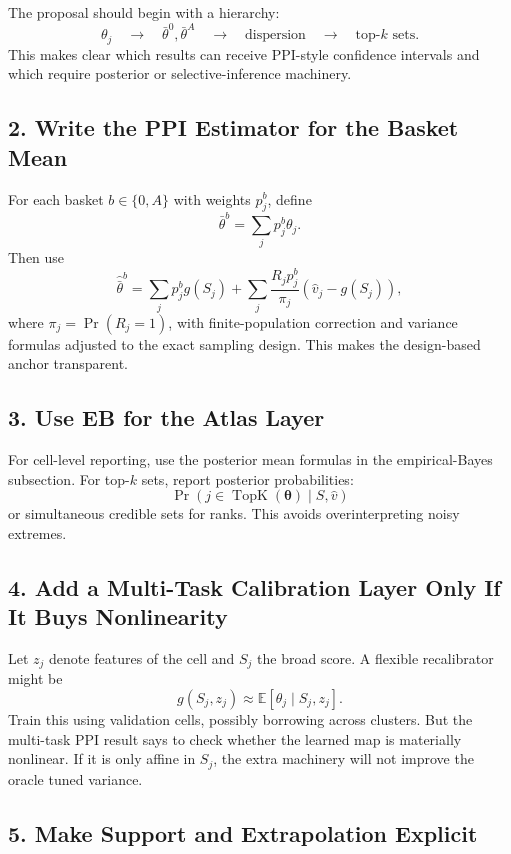 \documentclass[11pt]{article}
\newcommand{\E}{\mathbb{E}}
\newcommand{\thetav}{\boldsymbol{\theta}}
\begin{document}
The proposal should begin with a hierarchy:
\[
  \theta_j
  \quad\rightarrow\quad
  \bar\theta^0,\bar\theta^A
  \quad\rightarrow\quad
  \text{dispersion}
  \quad\rightarrow\quad
  \text{top-}k\text{ sets}.
\]
This makes clear which results can receive PPI-style confidence intervals and which require posterior or selective-inference machinery.

\subsection{2. Write the PPI Estimator for the Basket Mean}

For each basket $b\in\{0,A\}$ with weights $p_j^b$, define
\[
  \bar\theta^b=\sum_j p_j^b\theta_j.
\]
Then use
\[
  \widehat{\bar\theta}^{b}
  =
  \sum_j p_j^b g(S_j)
  +
  \sum_j
  \frac{R_j p_j^b}{\pi_j}
  \left(\widehat v_j-g(S_j)\right),
\]
where $\pi_j=\Pr(R_j=1)$, with finite-population correction and variance formulas adjusted to the exact sampling design. This makes the design-based anchor transparent.

\subsection{3. Use EB for the Atlas Layer}

For cell-level reporting, use the posterior mean formulas in the empirical-Bayes subsection. For top-$k$ sets, report posterior probabilities:
\[
  \Pr(j\in \operatorname{TopK}(\thetav)\mid S,\widehat v)
\]
or simultaneous credible sets for ranks. This avoids overinterpreting noisy extremes.

\subsection{4. Add a Multi-Task Calibration Layer Only If It Buys Nonlinearity}

Let $z_j$ denote features of the cell and $S_j$ the broad score. A flexible recalibrator might be
\[
  g(S_j,z_j)\approx \E[\theta_j\mid S_j,z_j].
\]
Train this using validation cells, possibly borrowing across clusters. But the multi-task PPI result says to check whether the learned map is materially nonlinear. If it is only affine in $S_j$, the extra machinery will not improve the oracle tuned variance.

\subsection{5. Make Support and Extrapolation Explicit}
\end{document}
